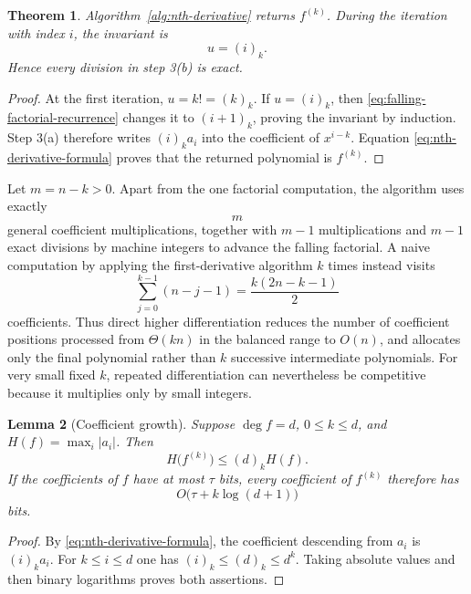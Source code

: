 \documentclass[11pt]{book}
\newtheorem{theorem}{Theorem}[section]
\newtheorem{lemma}[theorem]{Lemma}
\theoremstyle{definition}
\begin{document}
\begin{theorem}\label{thm:nth-derivative-correct}
Algorithm~\ref{alg:nth-derivative} returns $f^{(k)}$.  During the iteration
with index $i$, the invariant is
\[
 u=(i)_k.
\]
Hence every division in step 3(b) is exact.
\end{theorem}

\begin{proof}
At the first iteration, $u=k!=(k)_k$.  If $u=(i)_k$, then
\eqref{eq:falling-factorial-recurrence} changes it to $(i+1)_k$, proving the
invariant by induction.  Step 3(a) therefore writes
$(i)_k a_i$ into the coefficient of $x^{i-k}$.  Equation
\eqref{eq:nth-derivative-formula} proves that the returned polynomial is
$f^{(k)}$.
\end{proof}

Let $m=n-k>0$.  Apart from the one factorial computation, the algorithm uses
exactly
\[
 m
\]
general coefficient multiplications, together with $m-1$ multiplications and
$m-1$ exact divisions by machine integers to advance the falling factorial.
A naive computation by applying the first-derivative algorithm $k$ times
instead visits
\begin{equation}\label{eq:repeated-derivative-count}
 \sum_{j=0}^{k-1}(n-j-1)
 =\frac{k(2n-k-1)}{2}
\end{equation}
coefficients.  Thus direct higher differentiation reduces the number of
coefficient positions processed from $\Theta(kn)$ in the balanced range to
$O(n)$, and allocates only the final polynomial rather than $k$ successive
intermediate polynomials.  For very small fixed $k$, repeated differentiation
can nevertheless be competitive because it multiplies only by small
integers.

\begin{lemma}[Coefficient growth]\label{lem:nth-derivative-growth}
Suppose $\deg f=d$, $0\le k\le d$, and $H(f)=\max_i|a_i|$.  Then
\[
 H\bigl(f^{(k)}\bigr)\le (d)_k H(f).
\]
If the coefficients of $f$ have at most $\tau$ bits, every coefficient of
$f^{(k)}$ therefore has
\begin{equation}\label{eq:nth-derivative-bits}
 O\bigl(\tau+k\log(d+1)\bigr)
\end{equation}
bits.
\end{lemma}

\begin{proof}
By \eqref{eq:nth-derivative-formula}, the coefficient descending from $a_i$
is $(i)_k a_i$.  For $k\le i\le d$ one has $(i)_k\le(d)_k\le d^k$.
Taking absolute values and then binary logarithms proves both assertions.
\end{proof}
\end{document}
